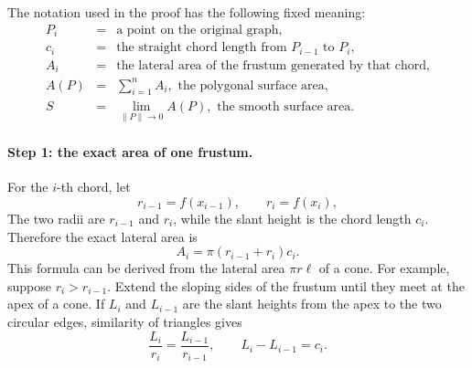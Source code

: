 The notation used in the proof has the following fixed meaning:
\[
    \begin{array}{ccl}
        P_i&=&\text{a point on the original graph},\\
        c_i&=&\text{the straight chord length from }P_{i-1}\text{ to }P_i,\\
        A_i&=&\text{the lateral area of the frustum generated by that chord},\\
        A(P)&=&\displaystyle\sum_{i=1}^n A_i,
                \text{ the polygonal surface area},\\
        S&=&\displaystyle\lim_{\lVert P\rVert\to0}A(P),
             \text{ the smooth surface area}.
    \end{array}
\]

\paragraph{Step 1: the exact area of one frustum.}
For the \(i\)-th chord, let
\[
    r_{i-1}=f(x_{i-1}),
    \qquad
    r_i=f(x_i),
\]
The two radii are \(r_{i-1}\) and \(r_i\), while the slant height is the
chord length \(c_i\).  Therefore the exact lateral area is
\[
    A_i=\pi(r_{i-1}+r_i)c_i.
\]
This formula can be derived from the lateral area \(\pi r\ell\) of a cone.
For example, suppose \(r_i>r_{i-1}\).  Extend the sloping sides of the
frustum until they meet at the apex of a cone.  If \(L_i\) and \(L_{i-1}\)
are the slant heights from the apex to the two circular edges, similarity of
triangles gives
\[
    \frac{L_i}{r_i}=\frac{L_{i-1}}{r_{i-1}},
    \qquad
    L_i-L_{i-1}=c_i.
\]

